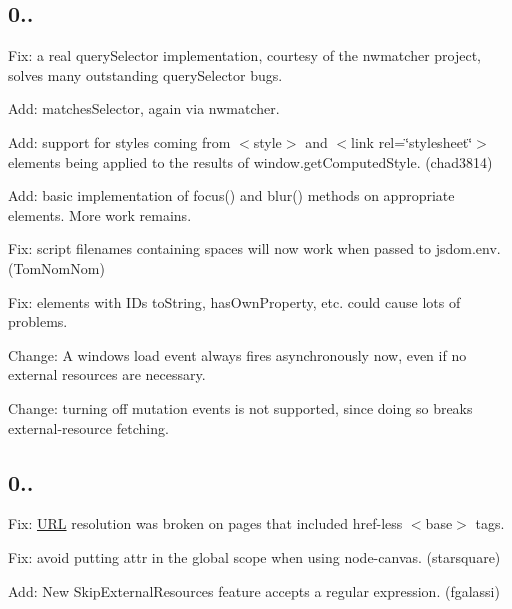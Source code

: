 \subsection*{0..}


\begin{DoxyItemize}
\item Fix\+: a real {\ttfamily query\+Selector} implementation, courtesy of the nwmatcher project, solves many outstanding {\ttfamily query\+Selector} bugs.
\item Add\+: {\ttfamily matches\+Selector}, again via nwmatcher.
\item Add\+: support for styles coming from {\ttfamily $<$style$>$} and {\ttfamily $<$link rel=\char`\"{}stylesheet\char`\"{}$>$} elements being applied to the results of {\ttfamily window.\+get\+Computed\+Style}. (chad3814)
\item Add\+: basic implementation of {\ttfamily focus()} and {\ttfamily blur()} methods on appropriate elements. More work remains.
\item Fix\+: script filenames containing spaces will now work when passed to {\ttfamily jsdom.\+env}. (Tom\+Nom\+Nom)
\item Fix\+: elements with I\+Ds {\ttfamily to\+String}, {\ttfamily has\+Own\+Property}, etc. could cause lots of problems.
\item Change\+: A window\textquotesingle{}s {\ttfamily load} event always fires asynchronously now, even if no external resources are necessary.
\item Change\+: turning off mutation events is not supported, since doing so breaks external-\/resource fetching.
\end{DoxyItemize}

\subsection*{0..}


\begin{DoxyItemize}
\item Fix\+: \mbox{\hyperlink{namespace_u_r_l}{U\+RL}} resolution was broken on pages that included {\ttfamily href}-\/less {\ttfamily $<$base$>$} tags.
\item Fix\+: avoid putting {\ttfamily attr} in the global scope when using node-\/canvas. (starsquare)
\item Add\+: New {\ttfamily Skip\+External\+Resources} feature accepts a regular expression. (fgalassi)
\end{DoxyItemize}

